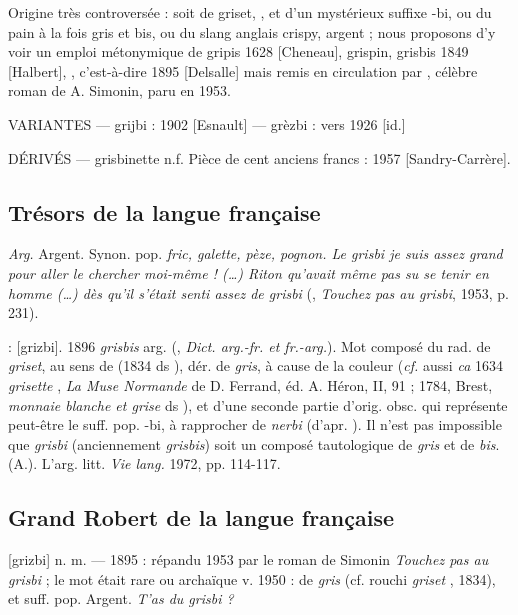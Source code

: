 Origine très controversée : soit de griset, , et d'un
mystérieux suffixe -bi, ou du pain à la fois gris et bis, ou du slang anglais
crispy, argent ; nous proposons d'y voir un emploi métonymique de gripis 1628
[Cheneau], grispin, grisbis 1849 [Halbert], , c'est-à-dire  1895 [Delsalle] mais remis en circulation par , célèbre roman de A. Simonin, paru en 1953.

VARIANTES ---  grijbi : 1902 [Esnault] --- grèzbi : vers 1926 [id.]

DÉRIVÉS --- grisbinette n.f. Pièce de cent anciens francs : 1957
[Sandry-Carrère].


\subsection*{Trésors de la langue française}

\emph{Arg.} Argent. Synon. pop. \emph{fric, galette, pèze, pognon. Le grisbi je suis assez grand pour aller le chercher moi-même ! (\ldots) Riton qu'avait même pas su se tenir en homme (\ldots) dès qu'il s'était senti assez de grisbi} (, \emph{Touchez pas au grisbi}, 1953, p. 231).

 : [grizbi].   1896 \emph{grisbis}
arg.  (, \emph{Dict. arg.-fr. et fr.-arg.}). Mot composé du rad. de \emph{griset}, au sens de  (1834 ds ), dér. de \emph{gris}, à cause de la couleur (\emph{cf.} aussi \emph{ca} 1634 \emph{grisette} , \emph{La Muse Normande} de D. Ferrand, éd. A. Héron, II, 91 ; 1784, Brest, \emph{monnaie blanche et grise} ds ), et d'une seconde partie d'orig. obsc. qui représente peut-être le suff. pop. -bi, à rapprocher de \emph{nerbi}  (d'apr. ). Il n'est pas impossible que \emph{grisbi} (anciennement \emph{grisbis}) soit un composé tautologique de \emph{gris} et de \emph{bis}.
  (A.). L'arg. litt. \emph{Vie lang.} 1972, pp. 114-117.


\subsection*{Grand Robert de la langue française}

[grizbi] n. m. --- 1895 : répandu 1953 par le roman de Simonin \emph{Touchez pas au grisbi} ; le mot était rare ou archaïque v. 1950 : de \emph{gris}  (cf. rouchi \emph{griset} , 1834), et suff. pop.  Argent. \emph{T'as du grisbi ?}


